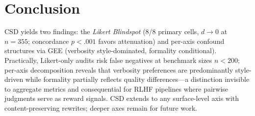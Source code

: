 \section{Conclusion}
\label{sec:conclusion}
CSD yields two findings: the \emph{Likert Blindspot} (8/8 primary cells, $d \!\to\! 0$ at $n{=}355$; concordance $p < .001$ favors attenuation) and per-axis confound structures via GEE (verbosity style-dominated, formality conditional).
Practically, Likert-only audits risk false negatives at benchmark sizes $n < 200$; per-axis decomposition reveals that verbosity preferences are predominantly style-driven while formality partially reflects quality differences---a distinction invisible to aggregate metrics and consequential for RLHF pipelines where pairwise judgments serve as reward signals.
CSD extends to any surface-level axis with content-preserving rewrites; deeper axes remain for future work.
